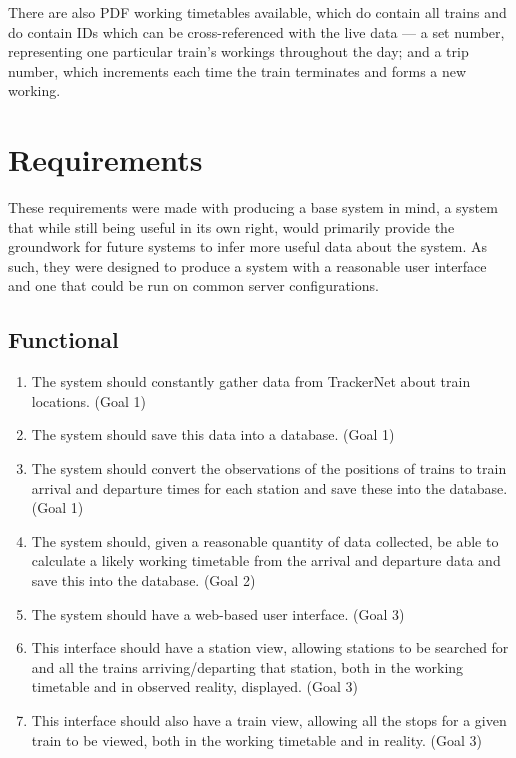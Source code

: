\documentclass[a4paper,12pt,twoside]{report}
\begin{document}
There are also PDF working timetables available\cite{TfLWTT}, which do contain
all trains and do contain IDs which can be cross-referenced with the live data
--- a set number, representing one particular train's workings throughout the
day; and a trip number, which increments each time the train terminates and
forms a new working.

\chapter{Requirements}

These requirements were made with producing a base system in mind, a system
that while still being useful in its own right, would primarily provide the
groundwork for future systems to infer more useful data about the system. As
such, they were designed to produce a system with a reasonable user interface
and one that could be run on common server configurations.

\section{Functional}

\begin{enumerate}
  \item The system should constantly gather data from TrackerNet about train
    locations. (Goal 1)
  \item The system should save this data into a database. (Goal 1)
  \item The system should convert the observations of the positions of trains
    to train arrival and departure times for each station and save these into
    the database. (Goal 1)
  \item The system should, given a reasonable quantity of data collected, be
    able to calculate a likely working timetable from the arrival and departure
    data and save this into the database. (Goal 2)
  \item The system should have a web-based user interface. (Goal 3)
  \item This interface should have a station view, allowing stations to be
    searched for and all the trains arriving/departing that station, both in
    the working timetable and in observed reality, displayed. (Goal 3)
  \item This interface should also have a train view, allowing all the stops
    for a given train to be viewed, both in the working timetable and in
    reality. (Goal 3)
\end{enumerate}
\end{document}
